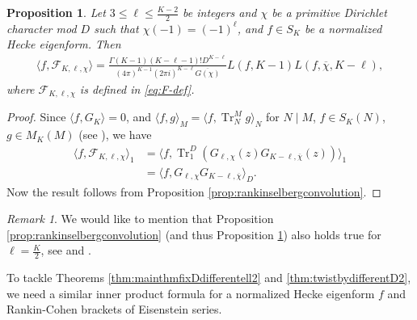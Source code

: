 \documentclass[11pt,letterpaper,reqno]{amsart}
\numberwithin{figure}{section}
\numberwithin{table}{section}
\theoremstyle{definition}
\theoremstyle{plain}
\newtheorem{proposition}[theorem]{Proposition}
\theoremstyle{definition}
\theoremstyle{definition}
\theoremstyle{remark}
\newtheorem{remark}{Remark}[section]
\numberwithin{equation}{section}
\theoremstyle{remark}
\DeclareMathOperator{\Tr}{Tr}
\begin{document}
\begin{proposition}\label{prop:Rankin-selbergperiod}
   Let $3\leq\ell\leq \frac{K-2}{2}$ be integers and $\chi$ be a primitive Dirichlet character mod $D$ such that $\chi(-1)=(-1)^{\ell}$, and $f\in S_K$ be a normalized Hecke eigenform. Then
    \begin{align}
        \langle f,\mathcal{F}_{K,\ell,\chi}\rangle=\frac{\Gamma(K-1)(K-\ell-1)!D^{K-\ell}}{(4\pi)^{K-1}(2\pi i)^{K-\ell}\overline{G(\chi)}}L(f,K-1)L(f,\overline{\chi},K-\ell),
        \label{eq:convolution}
    \end{align}
    where $\mathcal{F}_{K,\ell,\chi}$ is defined in \eqref{eq:F-def}.
\end{proposition}
\begin{proof}
    Since $\langle f, G_{K}\rangle=0$, and $\langle f,g\rangle_{M}=\langle f,\Tr_N^M g\rangle_{N}$ for $N\mid M$, $f\in S_K(N)$, $g\in M_{K}(M)$ (see \cite[p.~271]{GZ-86}), we have
    \begin{align}
    \langle f,\mathcal{F}_{K,\ell,\chi}\rangle_1&=\langle f,\Tr_1^D(G_{\ell,\chi}(z)G_{K-\ell,\overline{\chi}}(z))\rangle_1 \nonumber\\&= \langle f,G_{\ell,\chi}G_{K-\ell,\overline{\chi}}\rangle_{D}. \nonumber
    \end{align}
    Now the result follows from Proposition \ref{prop:rankinselbergconvolution}.
\end{proof}
\begin{remark}\label{remark:centralprod}
    We would like to mention that Proposition \ref{prop:rankinselbergconvolution} (and thus Proposition \ref{prop:Rankin-selbergperiod}) also holds true for $\ell=\frac{K}{2}$, see \cite[p.~146]{Zagier1976} and \cite[Proposition 4.1]{prodofEisenstein2018}.
\end{remark}
To tackle  Theorems \ref{thm:mainthmfixDdifferentell2} and \ref{thm:twistbydifferentD2}, we need a similar inner product formula for a normalized Hecke eigenform $f$ and Rankin-Cohen brackets of Eisenstein series. 
\end{document}
